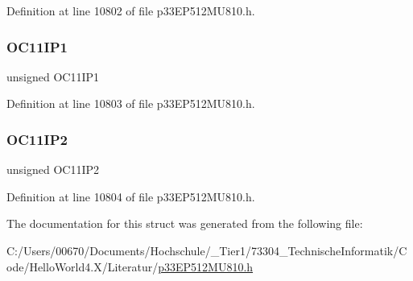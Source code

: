 Definition at line 10802 of file p33\+E\+P512\+M\+U810.\+h.

\mbox{\label{structtag_i_p_c31_b_i_t_s_aac8dbec9a1abda3b964f9c3ac4707295}} 
\subsubsection{\texorpdfstring{O\+C11\+I\+P1}{OC11IP1}}
{\footnotesize\ttfamily unsigned O\+C11\+I\+P1}



Definition at line 10803 of file p33\+E\+P512\+M\+U810.\+h.

\mbox{\label{structtag_i_p_c31_b_i_t_s_aa321649a3fd9eac67a43c337d8b82bb5}} 
\subsubsection{\texorpdfstring{O\+C11\+I\+P2}{OC11IP2}}
{\footnotesize\ttfamily unsigned O\+C11\+I\+P2}



Definition at line 10804 of file p33\+E\+P512\+M\+U810.\+h.



The documentation for this struct was generated from the following file\+:\begin{DoxyCompactItemize}
\item 
C\+:/\+Users/00670/\+Documents/\+Hochschule/\+\_\+\+Tier1/73304\+\_\+\+Technische\+Informatik/\+Code/\+Hello\+World4.\+X/\+Literatur/\hyperlink{p33_e_p512_m_u810_8h}{p33\+E\+P512\+M\+U810.\+h}\end{DoxyCompactItemize}
